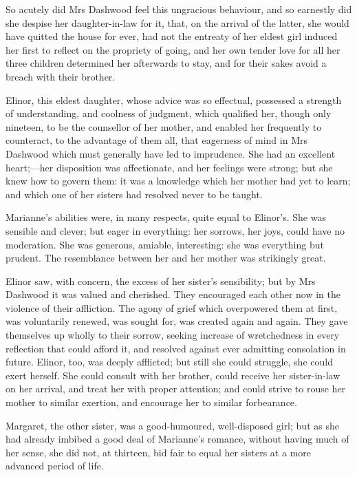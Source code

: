 So acutely did Mrs Dashwood feel this ungracious behaviour, and so earnestly did she despise her daughter-in-law for it, that, on the arrival of the latter, she would have quitted the house for ever, had not the entreaty of her eldest girl induced her first to reflect on the propriety of going, and her own tender love for all her three children determined her afterwards to stay, and for their sakes avoid a breach with their brother.

Elinor, this eldest daughter, whose advice was so effectual, possessed a strength of understanding, and coolness of judgment, which qualified her, though only nineteen, to be the counsellor of her mother, and enabled her frequently to counteract, to the advantage of them all, that eagerness of mind in Mrs Dashwood which must generally have led to imprudence. She had an excellent heart;—her disposition was affectionate, and her feelings were strong; but she knew how to govern them: it was a knowledge which her mother had yet to learn; and which one of her sisters had resolved never to be taught.

Marianne's abilities were, in many respects, quite equal to Elinor's. She was sensible and clever; but eager in everything: her sorrows, her joys, could have no moderation. She was generous, amiable, interesting: she was everything but prudent. The resemblance between her and her mother was strikingly great.

Elinor saw, with concern, the excess of her sister's sensibility; but by Mrs Dashwood it was valued and cherished. They encouraged each other now in the violence of their affliction. The agony of grief which overpowered them at first, was voluntarily renewed, was sought for, was created again and again. They gave themselves up wholly to their sorrow, seeking increase of wretchedness in every reflection that could afford it, and resolved against ever admitting consolation in future. Elinor, too, was deeply afflicted; but still she could struggle, she could exert herself. She could consult with her brother, could receive her sister-in-law on her arrival, and treat her with proper attention; and could strive to rouse her mother to similar exertion, and encourage her to similar forbearance.

Margaret, the other sister, was a good-humoured, well-disposed girl; but as she had already imbibed a good deal of Marianne's romance, without having much of her sense, she did not, at thirteen, bid fair to equal her sisters at a more advanced period of life.